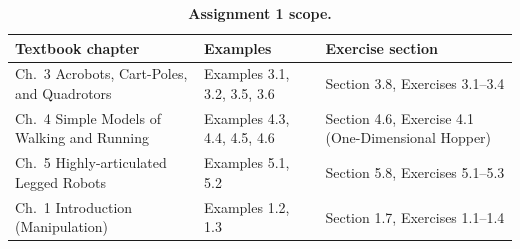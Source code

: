 \documentclass[11pt]{report}
\begin{document}
\begin{table}[!htbp]
\centering
\caption{\textbf{Assignment 1 scope.}}
\label{tab:scope}
\begin{tabular}{>{\raggedright\arraybackslash}p{}>{\raggedright\arraybackslash}p{}>{\raggedright\arraybackslash}p{}}
\toprule
Textbook chapter & Examples & Exercise section \\
\midrule
Ch.~3 Acrobots, Cart-Poles, and Quadrotors &
Examples 3.1, 3.2, 3.5, 3.6 & Section 3.8, Exercises 3.1--3.4 \\
Ch.~4 Simple Models of Walking and Running &
Examples 4.3, 4.4, 4.5, 4.6 & Section 4.6, Exercise 4.1 (One-Dimensional Hopper) \\
Ch.~5 Highly-articulated Legged Robots &
Examples 5.1, 5.2 & Section 5.8, Exercises 5.1--5.3 \\
Ch.~1 Introduction (Manipulation) &
Examples 1.2, 1.3 & Section 1.7, Exercises 1.1--1.4 \\
\bottomrule
\end{tabular}
\end{table}
\end{document}
